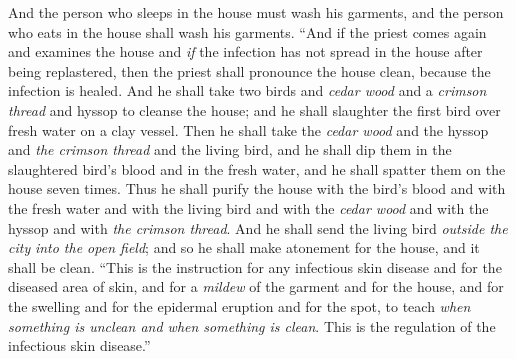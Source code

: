 \begin{biblechapter}
\verse And the person who sleeps in the house must wash his garments, and the person who eats in the house shall wash his garments.
\verse “And if the priest comes again and examines the house and \textit{if} the infection has not spread in the house after being replastered, then the priest shall pronounce the house clean, because the infection is healed.
\verse And he shall take two birds and \textit{cedar wood} and a \textit{crimson thread} and hyssop to cleanse the house;
\verse and he shall slaughter the first bird over fresh water on a clay vessel.
\verse Then he shall take the \textit{cedar wood} and the hyssop and \textit{the crimson thread} and the living bird, and he shall dip them in the slaughtered bird’s blood and in the fresh water, and he shall spatter them on the house seven times.
\verse Thus he shall purify the house with the bird’s blood and with the fresh water and with the living bird and with the \textit{cedar wood} and with the hyssop and with \textit{the crimson thread}.
\verse And he shall send the living bird \textit{outside the city} \textit{into the open field}; and so he shall make atonement for the house, and it shall be clean.
\verse “This is the instruction for any infectious skin disease and for the diseased area of skin,
\verse and for a \textit{mildew} of the garment and for the house,
\verse and for the swelling and for the epidermal eruption and for the spot,
\verse to teach \textit{when something is unclean and when something is clean}. This is the regulation of the infectious skin disease.”
\end{biblechapter}


